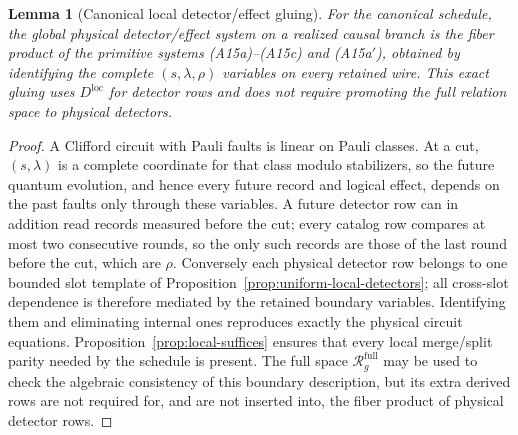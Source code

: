 \documentclass[aps,prx,reprint,superscriptaddress,nofootinbib,floatfix,longbibliography]{revtex4-2}
\newtheorem{lemma}[theorem]{Lemma}
\theoremstyle{definition}
\begin{document}
\begin{lemma}[Canonical local detector/effect gluing]
\label{lem:canonical-gluing}
For the canonical schedule, the global \emph{physical} detector/effect system
on a realized causal branch is the fiber product of the primitive systems
(A15a)--(A15c) and (A15a$'$), obtained by identifying the complete
$(s,\lambda,\rho)$ variables on every retained wire.  This exact gluing uses
$D^{\mathrm{loc}}$ for detector rows and does not require promoting the full
relation space to physical detectors.
\end{lemma}
\begin{proof}
A Clifford circuit with Pauli faults is linear on Pauli classes.  At a cut,
$(s,\lambda)$ is a complete coordinate for that class modulo stabilizers, so
the future quantum evolution, and hence every future record and logical
effect, depends on the past faults only through these variables.  A future
detector row can in addition read records measured before the cut; every
catalog row compares at most two consecutive rounds, so the only such records
are those of the last round before the cut, which are $\rho$.  Conversely each
physical detector row belongs to one bounded slot template of
Proposition~\ref{prop:uniform-local-detectors}; all cross-slot dependence is
therefore mediated by the retained boundary variables.  Identifying them and
eliminating internal ones reproduces exactly the physical circuit equations.
Proposition~\ref{prop:local-suffices} ensures that every local merge/split
parity needed by the schedule is present.  The full space
$\mathcal R_g^{\mathrm{full}}$ may be used to check the algebraic consistency of
this boundary description, but its extra derived rows are not required for,
and are not inserted into, the fiber product of physical detector rows.
\end{proof}
\end{document}
